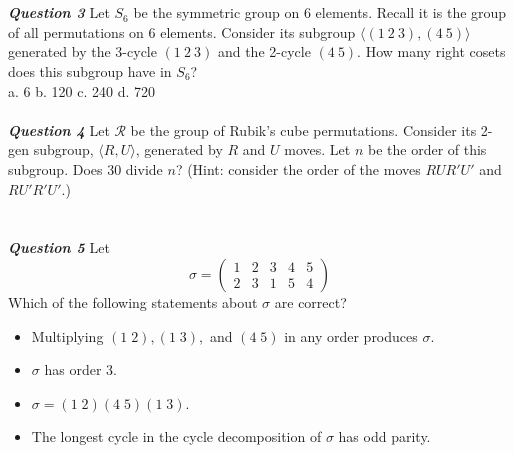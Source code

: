\documentclass{article}
\begin{document}
\\\\
\textbf{\textit{Question 3}} Let $S_6$ be the symmetric group on 6 elements. Recall it is the group of all permutations on 6 elements. Consider its subgroup $\langle (1\ 2\ 3), (4\ 5) \rangle$ generated by the 3-cycle $(1\ 2\ 3)$ and the 2-cycle $(4\ 5)$. How many right cosets does this subgroup have in $S_6$? \\
a. 6 \quad b. 120 \quad c. 240 \quad d. 720
\\\\
\textbf{\textit{Question 4}} Let $\mathcal{R}$ be the group of Rubik's cube permutations. Consider its 2-gen subgroup, $\langle R, U \rangle$, generated by $R$ and $U$ moves. Let $n$ be the order of this subgroup. Does 30 divide $n$?
(Hint: consider the order of the moves $RUR'U'$ and $RU'R'U'$.) \\
\\\\
\textbf{\textit{Question 5}}
Let
\[
\sigma=
\begin{pmatrix}
1 & 2 & 3 & 4 & 5 \\
2 & 3 & 1 & 5 & 4
\end{pmatrix}
\]
Which of the following statements about $\sigma$ are correct?
\begin{itemize}
\item Multiplying $(1\;2), (1\;3),$ and $(4\;5)$ in any order produces $\sigma$.
\item $\sigma$ has order 3.
\item $\sigma = (1\;2)(4\;5)(1\;3)$.
\item The longest cycle in the cycle decomposition of $\sigma$ has odd parity.
\end{itemize}
\end{document}
